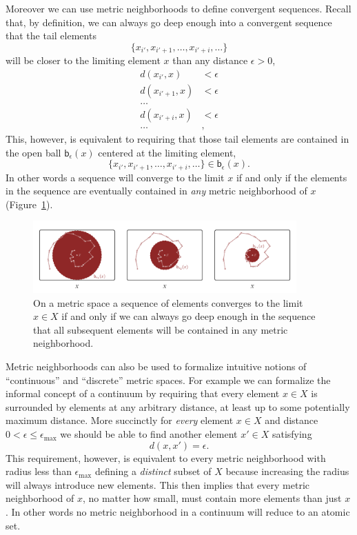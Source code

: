 \documentclass[
  letterpaper,
  DIV=11,
  numbers=noendperiod]{scrartcl}
\begin{document}
Moreover we can use metric neighborhoods to define convergent sequences.
Recall that, by definition, we can always go deep enough into a
convergent sequence that the tail elements \[
\{ x_{i'}, x_{i' + 1}, \ldots, x_{i' + i}, \ldots \}
\] will be closer to the limiting element \(x\) than any distance
\(\epsilon > 0\), \begin{align*}
d(x_{i'}, x) &< \epsilon
\\
d(x_{i' + 1}, x) &< \epsilon
\\
\ldots&
\\
d(x_{i' + i}, x) &< \epsilon
\\
\ldots&,
\end{align*} This, however, is equivalent to requiring that those tail
elements are contained in the open ball \(\mathsf{b}_{\epsilon}(x)\)
centered at the limiting element, \[
\{ x_{i'}, x_{i' + 1}, \ldots, x_{i' + i}, \ldots \}
\in \mathsf{b}_{\epsilon}(x).
\] In other words a sequence will converge to the limit \(x\) if and
only if the elements in the sequence are eventually contained in
\emph{any} metric neighborhood of \(x\)
(Figure~\ref{fig-metric-neighborhood-convergence}).

\begin{figure}

{\centering \includegraphics[width=0.9\textwidth,height=\textheight]{figures/structures/metric_topology/convergence/convergence.pdf}

}

\caption{\label{fig-metric-neighborhood-convergence}On a metric space a
sequence of elements converges to the limit \(x \in X\) if and only if
we can always go deep enough in the sequence that all subsequent
elements will be contained in any metric neighborhood.}

\end{figure}

Metric neighborhoods can also be used to formalize intuitive notions of
``continuous'' and ``discrete'' metric spaces. For example we can
formalize the informal concept of a continuum by requiring that every
element \(x \in X\) is surrounded by elements at any arbitrary distance,
at least up to some potentially maximum distance. More succinctly for
\emph{every} element \(x \in X\) and distance
\(0 < \epsilon \le \epsilon_{\max}\) we should be able to find another
element \(x' \in X\) satisfying \[
d(x, x') = \epsilon.
\] This requirement, however, is equivalent to every metric neighborhood
with radius less than \(\epsilon_{\max}\) defining a \emph{distinct}
subset of \(X\) because increasing the radius will always introduce new
elements. This then implies that every metric neighborhood of \(x\), no
matter how small, must contain more elements than just \(x\). In other
words no metric neighborhood in a continuum will reduce to an atomic
set.
\end{document}
